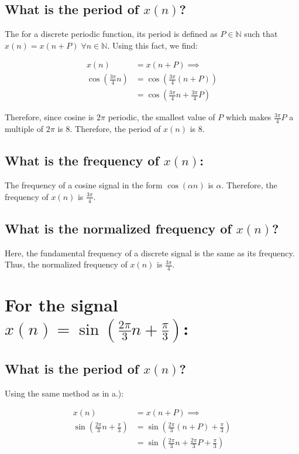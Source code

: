 \documentclass{article}
\renewcommand{\thesubsection}{\thesection.\alph{subsection}}
\begin{document}
\subsection[~\thesubsection]{What is the period of $x(n)$?}

The for a discrete periodic function, its period is defined as $P \in \mathbb{N}$ such that $x(n) = x(n + P) \; \forall n \in \mathbb{N}$. Using this fact, we find:

\begin{align*}
	x(n) &= x(n + P) \implies \\
	\cos{(\frac{3\pi}{4}n)} &= \cos{(\frac{3\pi}{4}(n + P))} \\
	&= \cos{(\frac{3\pi}{4}n + \frac{3\pi}{4}P)}
\end{align*}

Therefore, since cosine is $2\pi$ periodic, the smallest value of $P$ which makes $\frac{3\pi}{4}P$ a multiple of $2\pi$ is 8. Therefore, the period of $x(n)$ is 8.

\subsection[~\thesubsection]{What is the frequency of $x(n)$:}

The frequency of a cosine signal in the form $\cos{({\alpha}n)}$ is $\alpha$. Therefore, the frequency of $x(n)$ is $\frac{3\pi}{4}$.

\subsection[~\thesubsection]{What is the normalized frequency of $x(n)$?}

Here, the fundamental frequency of a discrete signal is the same as its frequency. Thus, the normalized frequency of $x(n)$ is $\frac{3\pi}{4}$.

\section[Question ~\thesection]{For the signal $x(n) = \sin{(\frac{2\pi}{3}n + \frac{\pi}{3})}$:}

\subsection[~\thesubsection]{What is the period of $x(n)$?}

Using the same method as in a.):

\begin{align*}
	x(n) &= x(n + P) \implies \\
	\sin{(\frac{2\pi}{3}n + \frac{\pi}{3})} &= \sin{(\frac{2\pi}{3}(n + P) + \frac{\pi}{3})} \\
	&= \sin{(\frac{2\pi}{3}n + \frac{2\pi}{3}P + \frac{\pi}{3})} \\\\
\end{align*}
\end{document}
